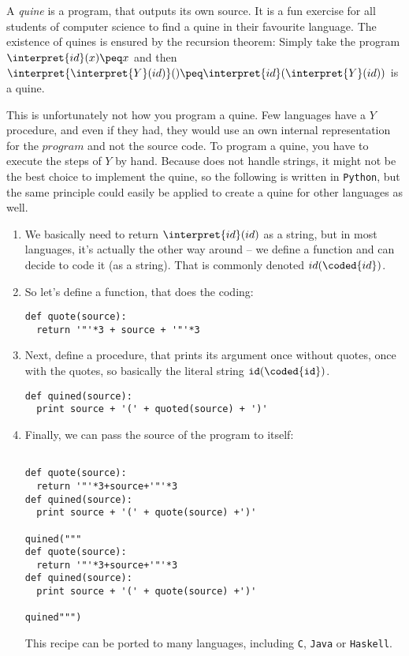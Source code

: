 \begin{example}[Quines]
	A \emph{quine}\/ is a program, that outputs its own source. It is a fun 
	exercise for all students of computer science to find a quine in their 
	favourite language. The existence of quines is ensured by the recursion theorem:
	Simply take the program $\interpret{id}(x)\peq x$ and then 
	$\interpret{\interpret{Y}(id)}() \peq \interpret{id}(\interpret{Y}(id))$ 
	is a quine.

	This is unfortunately not how you program a quine. Few languages have a $Y$ 
	procedure, and even if they had, they would use an own internal 
	representation for the $program$ and not the source code. To program 
	a quine, you have to execute the steps of $Y$ by hand. Because \WHILE does 
	not handle strings, it might not be the best choice to implement the quine, 
	so the following is written in {\tt Python}, but the same principle could 
	easily be applied to create a quine for other languages as well.

	\begin{enumerate}
		\item We basically need to return $\interpret{id}(id)$ as a string, but 
			in most languages, it's actually the other way around -- we define a 
			function and can decide to code it (as a string). That is commonly 
			denoted $id(\coded{id})$.
		\item So let's define a function, that does the coding:
\begin{verbatim}
def quote(source):
  return '"'*3 + source + '"'*3
\end{verbatim}
		\item Next, define a procedure, that prints its argument once without 
			quotes, once with the quotes, so basically the literal string ${\tt id(\coded{id})}$.
\begin{verbatim}
def quined(source):
  print source + '(' + quoted(source) + ')'
\end{verbatim}
		\item Finally, we can pass the source of the program to itself:
\begin{verbatim}

def quote(source):
  return '"'*3+source+'"'*3
def quined(source):
  print source + '(' + quote(source) +')'

quined("""
def quote(source):
  return '"'*3+source+'"'*3
def quined(source):
  print source + '(' + quote(source) +')'

quined""")
\end{verbatim}
		This recipe can be ported to many languages, including {\tt C}, {\tt Java} or {\tt Haskell}.
	\end{enumerate}
\end{example}

